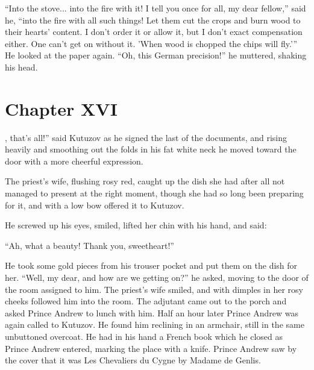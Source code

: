 ``Into the stove... into the fire with it! I tell you once for
all, my dear fellow,'' said he, ``into the fire with all such
things! Let them cut the crops and burn wood to their hearts'
content. I don't order it or allow it, but I don't exact
compensation either. One can't get on without it. 'When wood is
chopped the chips will fly.'{}'' He looked at the paper
again. ``Oh, this German precision!'' he muttered, shaking his
head.


\chapter*{Chapter XVI} \ifaudio {}
\fi

, that's all!'' said Kutuzov as he signed the last of the
documents, and rising heavily and smoothing out the folds in his
fat white neck he moved toward the door with a more cheerful
expression.

The priest's wife, flushing rosy red, caught up the dish she had
after all not managed to present at the right moment, though she
had so long been preparing for it, and with a low bow offered it
to Kutuzov.

He screwed up his eyes, smiled, lifted her chin with his hand,
and said:

``Ah, what a beauty! Thank you, sweetheart!''

He took some gold pieces from his trouser pocket and put them on
the dish for her. ``Well, my dear, and how are we getting on?''
he asked, moving to the door of the room assigned to him. The
priest's wife smiled, and with dimples in her rosy cheeks
followed him into the room.  The adjutant came out to the porch
and asked Prince Andrew to lunch with him. Half an hour later
Prince Andrew was again called to Kutuzov. He found him reclining
in an armchair, still in the same unbuttoned overcoat. He had in
his hand a French book which he closed as Prince Andrew entered,
marking the place with a knife. Prince Andrew saw by the cover
that it was Les Chevaliers du Cygne by Madame de Genlis.

